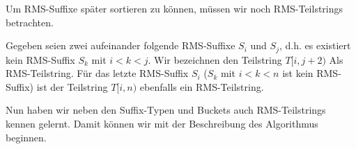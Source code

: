Um RMS-Suffixe später sortieren zu können, müssen wir noch RMS-Teilstrings betrachten.

\begin{definition}
	Gegeben seien zwei aufeinander folgende RMS-Suffixe $S_i$ und $S_j$, d.h. es existiert kein RMS-Suffix $S_k$ mit $i < k < j$. Wir bezeichnen den Teilstring $T[i, j+2)$ Als RMS-Teilstring. Für das letzte RMS-Suffix $S_i$ ($S_k$ mit $ i < k < n$ ist kein RMS-Suffix) ist der Teilstring $T[i, n)$ ebenfalls ein RMS-Teilstring.
\end{definition}

Nun haben wir neben den Suffix-Typen und Buckets auch RMS-Teilstrings kennen gelernt. Damit können wir mit der Beschreibung des Algorithmus beginnen.
